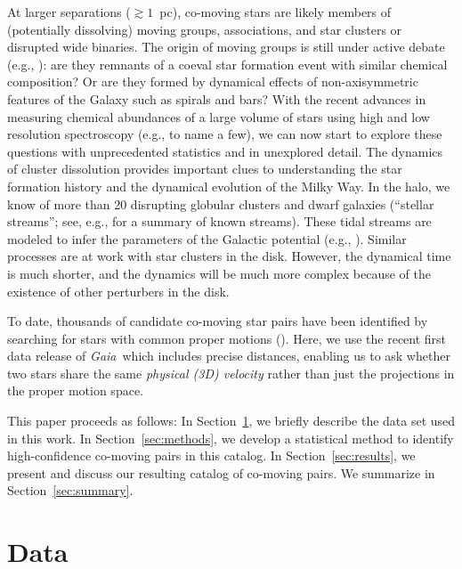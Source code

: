 \documentclass[manuscript, letterpaper]{aastex6}
\newcommand{\project}[1]{\textsl{#1}}
\newcommand{\gaia}{\project{Gaia}}
\newcommand{\sectionname}{Section}
\begin{document}
At larger separations ($\gtrsim 1$~pc), co-moving stars are likely members of
(potentially dissolving) moving groups, associations, and star clusters or
disrupted wide binaries.
The origin of moving groups is still under active debate (e.g., \citealt{Bovy:2010aa}):
are they remnants of a coeval
star formation event with similar chemical composition? Or are they formed by
dynamical effects of non-axisymmetric features of the Galaxy such as spirals
and bars? With the recent advances in measuring chemical abundances of
a large volume of stars using high and low resolution spectroscopy
(e.g., \citealt{Steinmetz:2006aa,Majewski:2015aa,Gilmore:2012aa} to name a few),
we can now start to explore these questions
with unprecedented statistics and in unexplored detail.
The dynamics of cluster dissolution provides important clues to understanding
the star formation history and the dynamical evolution of the Milky Way.
In the halo, we know of more than 20 disrupting globular clusters and dwarf galaxies
(``stellar streams''; see, e.g., \citealt{Grillmair:2016} for a summary of known streams).
These tidal streams are modeled to infer the parameters of the Galactic
potential (e.g., \citealt{Kupper:2015}).
Similar processes are at work with star clusters in the disk.
However, the dynamical time is much shorter, and the dynamics will be much more
complex because of the existence of other perturbers in the disk.

To date, thousands of candidate co-moving star pairs have been identified by
searching for stars with common proper motions
(\citealt{Poveda:1994aa,Allen:2000aa,Chaname:2004aa,Lepine:2007aa,Alonso-Floriano:2015aa}).
Here, we use the recent first data release of \gaia\ which includes precise distances,
enabling us to ask whether two stars share the same \emph{physical (3D) velocity} rather than
just the projections in the proper motion space.

This paper proceeds as follows:
In \sectionname~\ref{sec:data}, we briefly describe the data set used in
this work.
In \sectionname~\ref{sec:methods}, we develop a statistical method to identify
high-confidence co-moving pairs in this catalog.
In \sectionname~\ref{sec:results}, we present and discuss our resulting catalog
of co-moving pairs.
We summarize in \sectionname~\ref{sec:summary}.


\section{Data} \label{sec:data}
\end{document}
